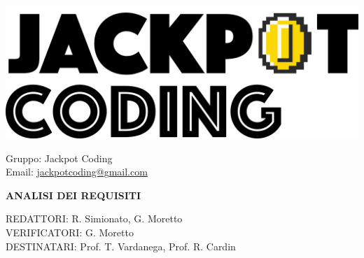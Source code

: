 \documentclass[5pt]{article}
\begin{document}
\begin{minipage}[t]{0.50\textwidth}
    \begin{flushleft}
        \hspace{10pt}
        \includegraphics[scale=0.65]{jackpot-logo.png} 
    \end{flushleft}
\end{minipage}
\hspace{-60pt} %
\begin{flushright}
    \begin{minipage}[t]{0.50\textwidth}
        \begin{flushright}
            Gruppo: {\Large Jackpot Coding}\\
            Email: \href{mailto:jackpotcoding@gmail.com}{jackpotcoding@gmail.com}
        \end{flushright}
    \end{minipage}
\end{flushright}

\vspace{24pt}

\begin{center}
    \textbf{\LARGE ANALISI DEI REQUISITI}
\end{center}

\vspace{13pt}

\begin{flushleft}
    \begin{spacing}{1.5}
        REDATTORI: R. Simionato, G. Moretto\\%
        VERIFICATORI: G. Moretto\\
        \vspace{7pt}
        DESTINATARI: Prof. T. Vardanega, Prof. R. Cardin\\%
    \end{spacing}
\end{flushleft}
\end{document}
